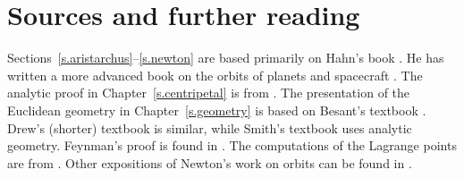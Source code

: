 
\chapter*{Sources and further reading}


\vspace*{-4ex}

Sections~\ref{s.aristarchus}--\ref{s.newton} are based primarily on Hahn's book \cite{hahn-cic}. He has written a more advanced book on the orbits of planets and spacecraft \cite{hahn-orbits}. The analytic proof in Chapter~\ref{s.centripetal} is from \cite{griffiths}. The presentation of the Euclidean geometry in Chapter~\ref{s.geometry} is based on Besant's textbook \cite{besant}. Drew's (shorter) textbook \cite{drew} is similar, while Smith's textbook \cite{smith} uses analytic geometry. Feynman's proof is found in \cite{lost}. The computations of the Lagrange points are from \cite{stern}. Other expositions of Newton's work on orbits can be found in \cite{hauser-lang,stein}. 

\vspace*{-2ex}

\begin{small}


\end{small}
